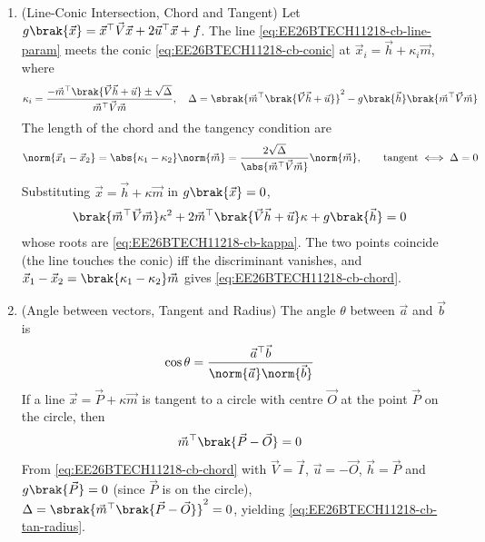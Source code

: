 \begin{enumerate}[label=\thesubsection.\arabic*, ref=\thesubsection.\theenumi,itemsep=1.5em]
\item (Line-Conic Intersection, Chord and Tangent) Let $g\brak{\vec{x}} = \vec{x}^{\top}\vec{V}\vec{x} + 2\vec{u}^{\top}\vec{x} + f$. The line \eqref{eq:EE26BTECH11218-cb-line-param} meets the conic \eqref{eq:EE26BTECH11218-cb-conic} at $\vec{x}_i = \vec{h} + \kappa_i \vec{m}$, where
\begin{align}
\kappa_i = \frac{-\vec{m}^{\top}\brak{\vec{V}\vec{h}+\vec{u}} \pm \sqrt{\Delta}}{\vec{m}^{\top}\vec{V}\vec{m}}, \quad
\Delta = \sbrak{\vec{m}^{\top}\brak{\vec{V}\vec{h}+\vec{u}}}^2 - g\brak{\vec{h}}\brak{\vec{m}^{\top}\vec{V}\vec{m}}
\label{eq:EE26BTECH11218-cb-kappa}
\end{align}
The length of the chord and the tangency condition are
\begin{align}
\norm{\vec{x}_1-\vec{x}_2} = \abs{\kappa_1-\kappa_2}\norm{\vec{m}} = \frac{2\sqrt{\Delta}}{\abs{\vec{m}^{\top}\vec{V}\vec{m}}}\norm{\vec{m}},
\qquad
\text{tangent} \iff \Delta = 0
\label{eq:EE26BTECH11218-cb-chord}
\end{align}
\solution Substituting $\vec{x} = \vec{h}+\kappa\vec{m}$ in $g\brak{\vec{x}}=0$,
\begin{align}
\brak{\vec{m}^{\top}\vec{V}\vec{m}}\kappa^2 + 2\vec{m}^{\top}\brak{\vec{V}\vec{h}+\vec{u}}\kappa + g\brak{\vec{h}} = 0
\end{align}
whose roots are \eqref{eq:EE26BTECH11218-cb-kappa}. The two points coincide (the line touches the conic) iff the discriminant vanishes, and $\vec{x}_1-\vec{x}_2 = \brak{\kappa_1-\kappa_2}\vec{m}$ gives \eqref{eq:EE26BTECH11218-cb-chord}.

\item (Angle between vectors, Tangent and Radius) The angle $\theta$ between $\vec{a}$ and $\vec{b}$ is
\begin{align}
\cos\theta = \frac{\vec{a}^{\top}\vec{b}}{\norm{\vec{a}}\norm{\vec{b}}}
\label{eq:EE26BTECH11218-cb-angle}
\end{align}
If a line $\vec{x}=\vec{P}+\kappa\vec{m}$ is tangent to a circle with centre $\vec{O}$ at the point $\vec{P}$ on the circle, then
\begin{align}
\vec{m}^{\top}\brak{\vec{P}-\vec{O}} = 0
\label{eq:EE26BTECH11218-cb-tan-radius}
\end{align}
\solution From \eqref{eq:EE26BTECH11218-cb-chord} with $\vec{V}=\vec{I}$, $\vec{u}=-\vec{O}$, $\vec{h}=\vec{P}$ and $g\brak{\vec{P}}=0$ (since $\vec{P}$ is on the circle), $\Delta = \sbrak{\vec{m}^{\top}\brak{\vec{P}-\vec{O}}}^2 = 0$, yielding \eqref{eq:EE26BTECH11218-cb-tan-radius}.


\end{enumerate}
